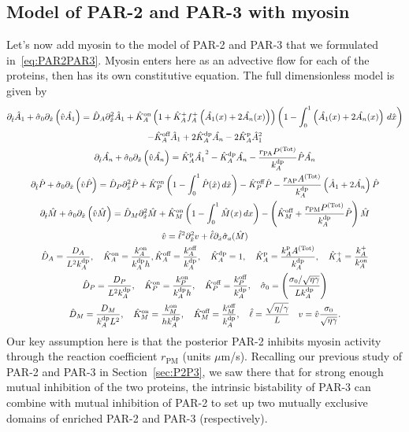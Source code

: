 \documentclass[11pt]{article}
\newcommand{\6}[1]{#1_{\text{6}}}
\newcommand{\3}[1]{#1_{\text{3}}}
\newcommand{\Tot}[1]{#1^\text{(Tot)}}
\newcommand{\A}[1]{#1_A}
\newcommand{\My}[1]{#1_M}
\begin{document}
\subsection{Model of PAR-2 and PAR-3 with myosin  \label{sec:P2P3My}}
Let's now add myosin to the model of PAR-2 and PAR-3 that we formulated in\ \eqref{eq:PAR2PAR3}. Myosin enters here as an advective flow for each of the proteins, then has its own constitutive equation. The full dimensionless model is given by
\begin{subequations}
\label{eq:PAR2PAR3My}
\begin{gather}
\nonumber
\Dthat \hat{A}_1 +\hat{\sigma}_0  \Dxhat \left(\hat{v} \hat{\MA} \right)   =\DhatA \Dxhat^2 \hat{A}_1 +\KhatonA\left(1+\hat{K}_A^+ f_A^+\left(\hat{\MA}(x) + 2\hat{\PA}(x)\right)\right)\left(1 - \int_0^1 \left(\hat{\MA}(x) + 2\hat{\PA}(x)\right) \, d\hat{x} \right) \\  
 -\KhatoffA \hat{A}_1 +2\KhatdpA \hat{\PA}-2 \KhatpA \hat{A}_1^2 \\ 
\Dthat \hat{\PA} +\hat{\sigma}_0  \Dxhat \left(\hat{v} \hat{\PA} \right)  =\KhatpA \hat{\MA}^2- \KhatdpA \hat{\PA}-\frac{r_\text{PA} \Tot{P}}{\kdp_A}\hat{P}\hat{\PA} \\ 
\Dthat \hat{P} +\hat{\sigma}_0  \Dxhat \left(\hat{v} \hat{P} \right)  =\DhatP \Dxhat^2 \hat{P}+\KhatonP \left(1 - \int_0^1 \hat{P}(\hat x) \, d\hat{x} \right)  - \KhatoffP \hat{P}-\frac{r_\text{AP} \Tot{A}}{\kdp_A}\left(\hat A_1 + 2\hat \PA\right)\hat{P} \\ 
\Dthat \hat{M} +\hat{\sigma}_0  \Dxhat \left(\hat{v} \hat{M} \right) =\hat{D}_M \Dxhat^2 \hat{M} +\KhatonM \left(1-\int_0^1  \hat{M}(x) \, dx\right)- \left(\KhatoffM+\frac{r_\text{PM}\Tot{P}}{\kdp_A}\hat{P} \right) \hat{M}\\
\hat{v} = \hat{\ell}^2 \Dxhat^2 v +\hat{\ell} \Dxhat \hat{\sigma}_a(\hat{M})\\ \nonumber
\DhatA =\frac{\A{D}}{L^2 \A{\kdp}}, \quad \KhatonA =\frac{\A{\kon}}{\A{\kdp} h }, \KhatoffA = \frac{\koff_A}{\kdp_A}, \quad \KhatdpA =1, \quad \KhatpA = \frac{\A{\kp} \Tot{A}}{\A{\kdp}}, \quad \KhatfA = \frac{\A{\kf}}{\A{\kon}} \\
\DhatP =\frac{D_P}{L^2 \A{\kdp}}, \quad \KhatonP =\frac{{\kon_P}}{\A{\kdp} h }, \quad \KhatoffP = \frac{\koff_P}{\kdp_A}, \quad \hat{\sigma}_0 = \left(\frac{\sigma_0/ \sqrt{\eta \gamma} }{L {\kdp_A}}\right)   \\ \nonumber
 \hat{D}_M =\frac{D_M}{{\kdp_A}  L^2}, \quad \KhatonM= \frac{\My{\kon}}{h {\kdp_A}}, \quad \KhatoffM = \frac{\koff_M}{\kdp_A}, \quad  \hat{\ell} = \frac{\sqrt{\eta/\gamma}}{L} \quad v = \hat{v} \frac{\sigma_0}{\sqrt{\eta \gamma}}.
\end{gather}
\end{subequations}
Our key assumption here is that the posterior PAR-2 inhibits myosin activity through the reaction coefficient $r_\text{PM}$ (units $\mu$m/s). Recalling our previous study of PAR-2 and PAR-3 in Section\ \ref{sec:P2P3}, we saw there that for strong enough mutual inhibition of the two proteins, the intrinsic bistability of PAR-3 can combine with mutual inhibition of PAR-2 to set up two mutually exclusive domains of enriched PAR-2 and PAR-3 (respectively). 
\end{document}
